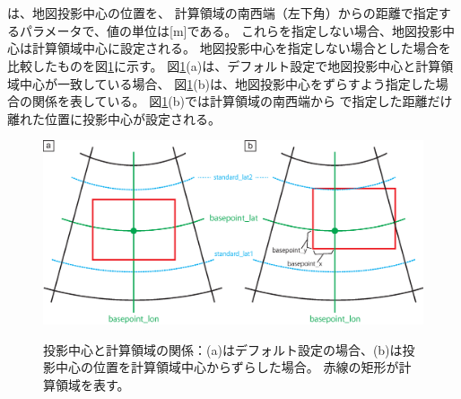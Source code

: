 {\small {\gt
{}}}\\~\\

\noindent
{}は、地図投影中心の位置を、
計算領域の南西端（左下角）からの距離で指定するパラメータで、値の単位は[m]である。
これらを指定しない場合、地図投影中心は計算領域中心に設定される。
地図投影中心を指定しない場合とした場合を比較したものを図\ref{fig:map_lc}に示す。
図\ref{fig:map_lc}(a)は、デフォルト設定で地図投影中心と計算領域中心が一致している場合、
図\ref{fig:map_lc}(b)は、地図投影中心をずらすよう指定した場合の関係を表している。
図\ref{fig:map_lc}(b)では計算領域の南西端から
で指定した距離だけ離れた位置に投影中心が設定される。

\begin{figure}[t]
\begin{center}
  \includegraphics[width=0.8\hsize]{./figure/LC_latlon_xy.eps}\\
  \caption{投影中心と計算領域の関係：(a)はデフォルト設定の場合、(b)は投影中心の位置を計算領域中心からずらした場合。
  赤線の矩形が計算領域を表す。}
  \label{fig:map_lc}
\end{center}
\end{figure}
